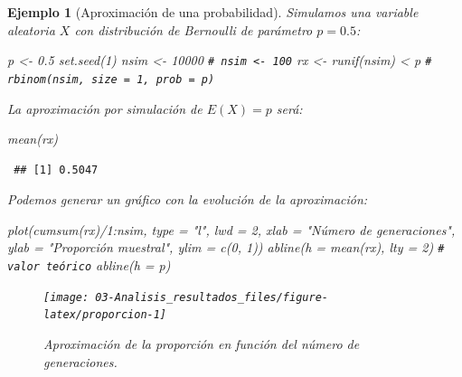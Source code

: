 \documentclass[
]{book}
\newenvironment{Shaded}{\begin{snugshade}}{\end{snugshade}}
\newcommand{\AttributeTok}[1]{\textcolor[rgb]{0.77,0.63,0.00}{#1}}
\newcommand{\CommentTok}[1]{\textcolor[rgb]{0.56,0.35,0.01}{\textit{#1}}}
\newcommand{\DecValTok}[1]{\textcolor[rgb]{0.00,0.00,0.81}{#1}}
\newcommand{\FloatTok}[1]{\textcolor[rgb]{0.00,0.00,0.81}{#1}}
\newcommand{\FunctionTok}[1]{\textcolor[rgb]{0.00,0.00,0.00}{#1}}
\newcommand{\NormalTok}[1]{#1}
\newcommand{\OtherTok}[1]{\textcolor[rgb]{0.56,0.35,0.01}{#1}}
\newcommand{\SpecialCharTok}[1]{\textcolor[rgb]{0.00,0.00,0.00}{#1}}
\newcommand{\StringTok}[1]{\textcolor[rgb]{0.31,0.60,0.02}{#1}}
\theoremstyle{break}
\newtheorem{example}{Ejemplo}[chapter]
\theoremstyle{nonumberplain}
\renewcommand{\CommentTok}[1]{\textcolor[rgb]{0.41,0.41,0.41}{\texttt{#1}}}
\begin{document}
\begin{example}[Aproximación de una probabilidad]

Simulamos una variable aleatoria \(X\) con distribución de Bernoulli de parámetro \(p=0.5\):

\begin{Shaded}
\begin{Highlighting}[]
\NormalTok{p }\OtherTok{\textless{}{-}} \FloatTok{0.5}
\FunctionTok{set.seed}\NormalTok{(}\DecValTok{1}\NormalTok{)}
\NormalTok{nsim }\OtherTok{\textless{}{-}} \DecValTok{10000} \CommentTok{\# nsim \textless{}{-} 100}
\NormalTok{rx }\OtherTok{\textless{}{-}} \FunctionTok{runif}\NormalTok{(nsim) }\SpecialCharTok{\textless{}}\NormalTok{ p }\CommentTok{\# rbinom(nsim, size = 1, prob = p)}
\end{Highlighting}
\end{Shaded}

La aproximación por simulación de \(E(X) = p\) será:

\begin{Shaded}
\begin{Highlighting}[]
\FunctionTok{mean}\NormalTok{(rx) }
\end{Highlighting}
\end{Shaded}

\begin{verbatim}
 ## [1] 0.5047
\end{verbatim}

Podemos generar un gráfico con la evolución de la aproximación:

\begin{Shaded}
\begin{Highlighting}[]
\FunctionTok{plot}\NormalTok{(}\FunctionTok{cumsum}\NormalTok{(rx)}\SpecialCharTok{/}\DecValTok{1}\SpecialCharTok{:}\NormalTok{nsim, }\AttributeTok{type =} \StringTok{"l"}\NormalTok{, }\AttributeTok{lwd =} \DecValTok{2}\NormalTok{, }\AttributeTok{xlab =} \StringTok{"Número de generaciones"}\NormalTok{, }
     \AttributeTok{ylab =} \StringTok{"Proporción muestral"}\NormalTok{, }\AttributeTok{ylim =} \FunctionTok{c}\NormalTok{(}\DecValTok{0}\NormalTok{, }\DecValTok{1}\NormalTok{))}
\FunctionTok{abline}\NormalTok{(}\AttributeTok{h =} \FunctionTok{mean}\NormalTok{(rx), }\AttributeTok{lty =} \DecValTok{2}\NormalTok{)}
\CommentTok{\# valor teórico}
\FunctionTok{abline}\NormalTok{(}\AttributeTok{h =}\NormalTok{ p) }
\end{Highlighting}
\end{Shaded}

\begin{figure}[!htb]

{\centering \texttt{[image: 03-Analisis\_resultados\_files/figure-latex/proporcion-1]} 

}

\caption{Aproximación de la proporción en función del número de generaciones.}\label{fig:proporcion}
\end{figure}

\end{example}
\end{document}
